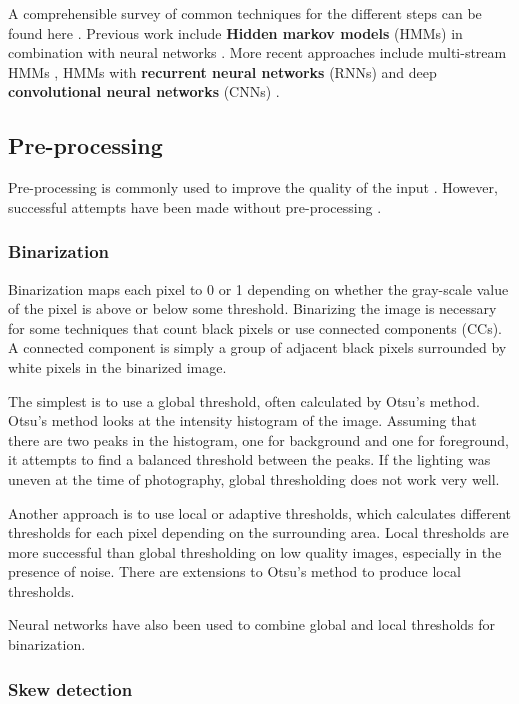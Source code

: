 A comprehensible survey of common techniques for the different steps can be found here \cite{HWR_survey}.
Previous work include \textbf{Hidden markov models} (HMMs) in combination with neural networks \cite{Offline_HWR_HMM_ANN}.
More recent approaches include multi-stream HMMs \cite{HWR_multi_stream_HMM_arabic}, HMMs with \textbf{recurrent neural networks} (RNNs) \cite{Offline_HWR_RNN} and deep \textbf{convolutional neural networks} (CNNs) \cite{offline_HWR_CNN}.

\subsection{Pre-processing}

Pre-processing is commonly used to improve the quality of the input \cite{HWR_survey}. However, successful attempts have been made without pre-processing \cite{FornesCnnCategorization}.

\subsubsection{Binarization}

Binarization maps each pixel to 0 or 1 depending on whether the gray-scale value of the pixel is above or below some threshold.
Binarizing the image is necessary for some techniques that count black pixels
or use connected components (CCs). A connected component is simply a group of adjacent black pixels surrounded by white pixels in the binarized image.

The simplest is to use a global threshold, often calculated by Otsu's method. Otsu's method looks at the intensity histogram of the image. Assuming that there are two peaks in the histogram, one for background and one for foreground, it attempts to find a balanced threshold between the peaks. If the lighting was uneven at the time of photography, global thresholding does not work very well.

Another approach is to use local or adaptive thresholds, which calculates different thresholds for each pixel depending on the surrounding area. Local thresholds are more successful than global thresholding on low quality images, especially in the presence of noise. There are extensions to Otsu's method to produce local thresholds.

Neural networks have also been used to combine global and local thresholds for binarization.

\subsubsection{Skew detection}

